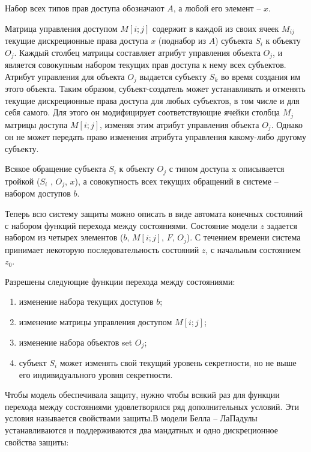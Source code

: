 Набор всех типов прав доступа обозначают $A$, а любой его элемент -- $x$. 

Матрица управления доступом $M[i;j]$ содержит в каждой из своих ячеек $M_{ij}$ текущие дискреционные права доступа $x$ (поднабор из $A$) субъекта $S_i$ к объекту $O_j$. Каждый столбец матрицы составляет атрибут управления объекта $O_j$, и является совокупным набором текущих прав доступа к нему всех субъектов. Атрибут управления для объекта $O_j$ выдается субъекту $S_k$ во время создания им этого объекта. Таким образом, субъект-создатель может устанавливать и отменять текущие дискреционные права доступа для любых субъектов, в том числе и для себя самого. Для этого он модифицирует соответствующие ячейки столбца $M_j$ матрицы доступа $M[i;j]$, изменяя этим атрибут управления объекта $O_j$. Однако он не может передать право изменения атрибута управления какому-либо другому субъекту. 

Всякое обращение субъекта $S_i$ к объекту $O_j$ с типом доступа x описывается тройкой ($S_i$ , $O_j$, $x$), а совокупность всех текущих обращений в системе -- набором доступов $b$. 

Теперь всю систему защиты можно описать в виде автомата конечных состояний с набором функций перехода между состояниями. Состояние модели $z$ задается набором из четырех элементов ($b$, $M[i;j]$, $F$,  $O_j$). С течением времени система принимает некоторую последовательность состояний $z$, с начальным состоянием $z_0$. 

Разрешены следующие функции перехода между состояниями: 

\begin{enumerate}
	\item изменение набора текущих доступов $b$; 
	\item изменение матрицы управления доступом $M[i;j]$; 
	\item изменение набора объектов set $O_j$;
	\item субъект $S_i$ может изменять свой текущий уровень секретности, но не выше его индивидуального уровня секретности. 
\end{enumerate}

Чтобы модель обеспечивала защиту, нужно чтобы всякий раз для функции перехода между состояниями удовлетворялся ряд дополнительных условий. Эти условия называется свойствами защиты.В модели Белла – ЛаПадулы устанавливаются и поддерживаются два мандатных и одно дискреционное свойства защиты\footnotemark:


